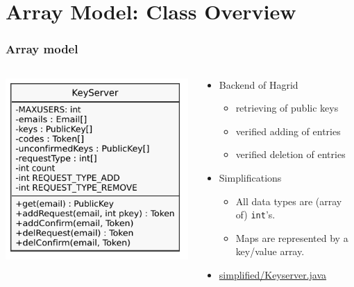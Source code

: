 \documentclass{beamer}
\begin{document}
\section{Array Model: Class Overview}
\begin{frame}
    \frametitle{Array model}
    \begin{columns}
    \begin{column}{.4\textwidth}
        \includegraphics[width=\textwidth]{simplified_uml.pdf}
    \end{column}
    \begin{column}{.6\textwidth}
        \begin{itemize}
            \item Backend of Hagrid
            \begin{itemize}
                \item retrieving of public keys
                \item verified adding of entries
                \item verified deletion of entries
            \end{itemize}
            \item Simplifications
            \begin{itemize}
                \item All data types are (array of) \texttt{int}'s.
                \item Maps are represented by a key/value array.
            \end{itemize}
            \item \href{https://github.com/KeYProject/verifythis-ltc-2020/blob/master/simplified/Keyserver.java}%
                        {simplified/Keyserver.java}
        \end{itemize}
    \end{column}
    \end{columns}
\end{frame}
\end{document}
